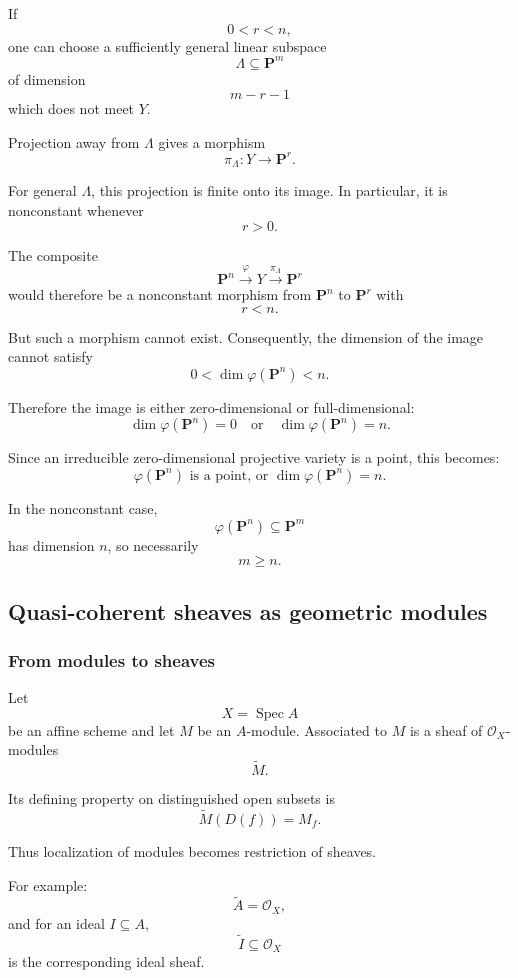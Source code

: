 If
\[
0<r<n,
\]
one can choose a sufficiently general linear subspace
\[
\Lambda\subseteq\mathbf{P}^m
\]
of dimension
\[
m-r-1
\]
which does not meet \(Y\).

Projection away from \(\Lambda\) gives a morphism
\[
\pi_{\Lambda}:Y\longrightarrow\mathbf{P}^r.
\]

For general \(\Lambda\), this projection is finite onto its image. In particular, it is nonconstant whenever
\[
r>0.
\]

The composite
\[
\mathbf{P}^n
\xrightarrow{\varphi}
Y
\xrightarrow{\pi_{\Lambda}}
\mathbf{P}^r
\]
would therefore be a nonconstant morphism from \(\mathbf{P}^n\) to \(\mathbf{P}^r\) with
\[
r<n.
\]

But such a morphism cannot exist. Consequently, the dimension of the image cannot satisfy
\[
0<\dim \varphi(\mathbf{P}^n)<n.
\]

Therefore the image is either zero-dimensional or full-dimensional:
\[
\boxed{
	\dim\varphi(\mathbf{P}^n)=0
	\quad\text{or}\quad
	\dim\varphi(\mathbf{P}^n)=n.
}
\]

Since an irreducible zero-dimensional projective variety is a point, this becomes:
\[
\boxed{
	\varphi(\mathbf{P}^n)\text{ is a point, or }
	\dim\varphi(\mathbf{P}^n)=n.
}
\]

In the nonconstant case,
\[
\varphi(\mathbf{P}^n)\subseteq\mathbf{P}^m
\]
has dimension \(n\), so necessarily
\[
m\geq n.
\]

\subsection{Quasi-coherent sheaves as geometric modules}

\subsubsection{From modules to sheaves}

Let
\[
X=\operatorname{Spec} A
\]
be an affine scheme and let \(M\) be an \(A\)-module. Associated to \(M\) is a sheaf of \(\mathcal{O}_X\)-modules
\[
\widetilde{M}.
\]

Its defining property on distinguished open subsets is
\[
\widetilde{M}(D(f))=M_f.
\]

Thus localization of modules becomes restriction of sheaves.

For example:
\[
\widetilde{A}=\mathcal{O}_X,
\]
and for an ideal \(I\subseteq A\),
\[
\widetilde{I}\subseteq \mathcal{O}_X
\]
is the corresponding ideal sheaf.

